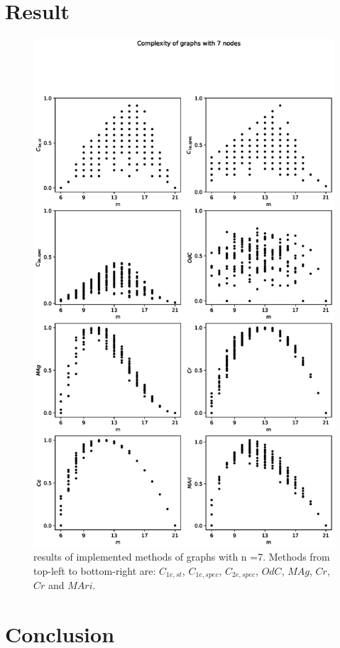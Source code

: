 \documentclass[12pt]{article}
\begin{document}
\section{Result}


\clearpage
\begin{figure}[ht]
    \includegraphics[width=\textwidth]{complexities.eps}
    \centering
    \caption{results of implemented methods of graphs with n =7. Methods from top-left to bottom-right are: $C_{1e,st}$, $C_{1e,spec}$, $C_{2e,spec}$, $OdC$, $MAg$, $Cr$, $Cr$ and $MAri$.}
\end{figure}
\section{Conclusion}

\printbibliography
\end{document}
